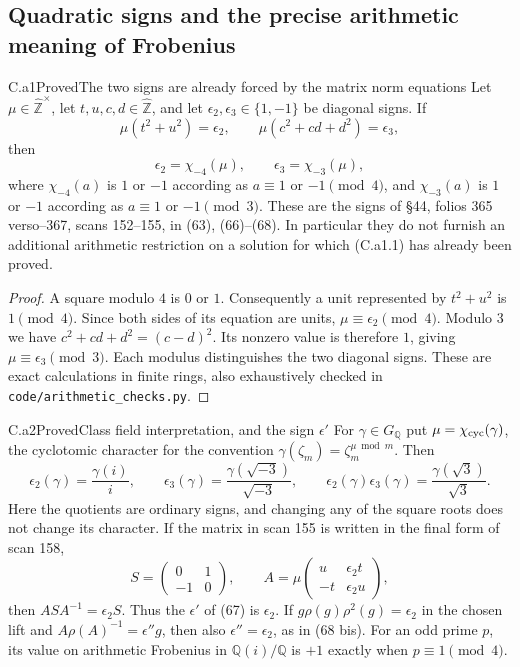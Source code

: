 \subsection{Quadratic signs and the precise arithmetic meaning of Frobenius}

\begin{claim}{C.a1}{Proved}{The two signs are already forced by the matrix norm equations}
Let $\mu\in\widehat{\mathbb Z}^{\times}$, let $t,u,c,d\in\widehat{\mathbb Z}$,
and let $\epsilon_2,\epsilon_3\in\{1,-1\}$ be diagonal signs. If
\[
 \mu(t^2+u^2)=\epsilon_2,\qquad
 \mu(c^2+cd+d^2)=\epsilon_3,
 \tag{C.a1.1}
\]
then
\[
 \epsilon_2=\chi_{-4}(\mu),\qquad
 \epsilon_3=\chi_{-3}(\mu),
\]
where $\chi_{-4}(a)$ is $1$ or $-1$ according as $a\equiv1$ or $-1\pmod4$,
and $\chi_{-3}(a)$ is $1$ or $-1$ according as $a\equiv1$ or $-1\pmod3$.
These are the signs of \S44, folios 365 verso--367, scans 152--155, in
(63), (66)--(68). In particular they do not furnish an additional
arithmetic restriction on a solution for which (C.a1.1) has already been proved.
\end{claim}
\begin{proof}
A square modulo $4$ is $0$ or $1$. Consequently a unit represented by
$t^2+u^2$ is $1\pmod4$. Since both sides of its equation are units,
$\mu\equiv\epsilon_2\pmod4$. Modulo $3$ we have
$c^2+cd+d^2=(c-d)^2$. Its nonzero value is therefore $1$, giving
$\mu\equiv\epsilon_3\pmod3$. Each modulus distinguishes the two diagonal
signs. These are exact calculations in finite rings, also exhaustively
checked in \texttt{code/arithmetic\_checks.py}.
\end{proof}

\begin{claim}{C.a2}{Proved}{Class field interpretation, and the sign $\epsilon'$}
For $\gamma\in G_{\mathbb Q}$ put $\mu=\chi_{\rm cyc}(\gamma)$, the
cyclotomic character for the convention
$\gamma(\zeta_m)=\zeta_m^{\mu\bmod m}$. Then
\[
 \epsilon_2(\gamma)=\frac{\gamma(i)}i,\qquad
 \epsilon_3(\gamma)=\frac{\gamma(\sqrt{-3})}{\sqrt{-3}},\qquad
 \epsilon_2(\gamma)\epsilon_3(\gamma)
       =\frac{\gamma(\sqrt3)}{\sqrt3}.
 \tag{C.a2.1}
\]
Here the quotients are ordinary signs, and changing any of the square roots
does not change its character. If the matrix in scan 155 is written in
the final form of scan 158,
\[
 S=\begin{pmatrix}0&1\\-1&0\end{pmatrix},\qquad
 A=\mu\begin{pmatrix}u&\epsilon_2t\\-t&\epsilon_2u\end{pmatrix},
\]
then $ASA^{-1}=\epsilon_2 S$. Thus the $\epsilon'$ of (67) is
$\epsilon_2$. If $g\rho(g)\rho^2(g)=\epsilon_2$ in the chosen
lift and $A\rho(A)^{-1}=\epsilon''g$, then also
$\epsilon''=\epsilon_2$, as in (68 bis). For an odd prime $p$, its value on arithmetic Frobenius in
$\mathbb Q(i)/\mathbb Q$ is $+1$ exactly when $p\equiv1\pmod4$.
\end{claim}

